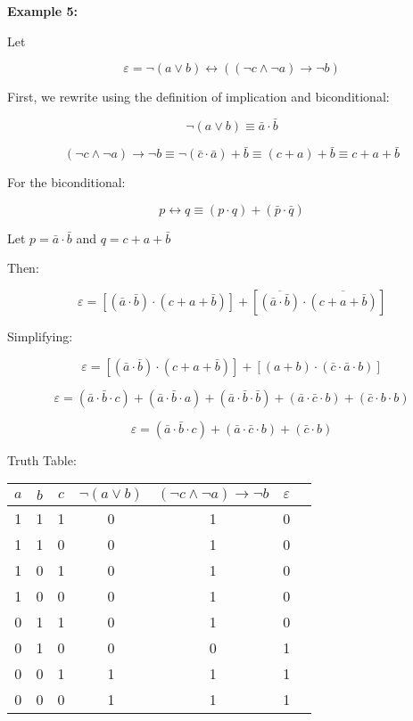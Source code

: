 \documentclass[12pt,a4paper,openany]{article}
\begin{document}
\textbf{Example 5:}

Let

$$\varepsilon = \neg(a \lor b) \leftrightarrow ((\neg c \land \neg a) \to \neg b)$$

First, we rewrite using the definition of implication and biconditional:

$$\neg(a \lor b) \equiv \bar{a} \cdot \bar{b}$$

$$(\neg c \land \neg a) \to \neg b \equiv \neg(\bar{c} \cdot \bar{a}) + \bar{b} \equiv (c + a) + \bar{b} \equiv c + a + \bar{b}$$

For the biconditional:

$$p \leftrightarrow q \equiv (p \cdot q) + (\bar{p} \cdot \bar{q})$$

Let $p = \bar{a} \cdot \bar{b}$ and $q = c + a + \bar{b}$

Then:

$$
\varepsilon = [(\bar{a} \cdot \bar{b}) \cdot (c + a + \bar{b})] + [\overline{(\bar{a} \cdot \bar{b})} \cdot \overline{(c + a + \bar{b})}]
$$

Simplifying:

$$
\varepsilon = [(\bar{a} \cdot \bar{b}) \cdot (c + a + \bar{b})] + [(a + b) \cdot (\bar{c} \cdot \bar{a} \cdot b)]
$$

$$
\varepsilon = (\bar{a} \cdot \bar{b} \cdot c) + (\bar{a} \cdot \bar{b} \cdot a) + (\bar{a} \cdot \bar{b} \cdot \bar{b}) + (\bar{a} \cdot \bar{c} \cdot b) + (\bar{c} \cdot b \cdot b)
$$

$$
\varepsilon = (\bar{a} \cdot \bar{b} \cdot c) + (\bar{a} \cdot \bar{c} \cdot b) + (\bar{c} \cdot b)
$$

Truth Table: 

\begin{center}
\begin{tabular}{|c|c|c|c|c|c|c|}
\hline
$a$ & $b$ & $c$ & $\neg(a \lor b)$ & $(\neg c \land \neg a) \to \neg b$ & $\varepsilon$ \\
\hline
1 & 1 & 1 & 0 & 1 & 0 \\
\hline
1 & 1 & 0 & 0 & 1 & 0 \\
\hline
1 & 0 & 1 & 0 & 1 & 0 \\
\hline
1 & 0 & 0 & 0 & 1 & 0 \\
\hline
0 & 1 & 1 & 0 & 1 & 0 \\
\hline
0 & 1 & 0 & 0 & 0 & 1 \\
\hline
0 & 0 & 1 & 1 & 1 & 1 \\
\hline
0 & 0 & 0 & 1 & 1 & 1 \\
\hline
\end{tabular}
\end{center}
\end{document}
